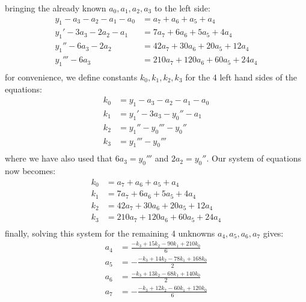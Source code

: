 bringing the already known $a_0, a_1, a_2, a_3$ to the left side:
\begin{equation}
\begin{aligned}
 y_1    -   a_3 -   a_2 - a_1 - a_0 &=     a_7 +     a_6 +    a_5 +    a_4  \\
 y_1'   - 3 a_3 - 2 a_2 - a_1       &=   7 a_7 +   6 a_6 +  5 a_5 +  4 a_4  \\
 y_1''  - 6 a_3 - 2 a_2             &=  42 a_7 +  30 a_6 + 20 a_5 + 12 a_4  \\ 
 y_1''' - 6 a_3                     &= 210 a_7 + 120 a_6 + 60 a_5 + 24 a_4  \\  
\end{aligned} 
\end{equation}
for convenience, we define constants $k_0, k_1, k_2, k_3$ for the 4 left hand sides of the equations:
\begin{equation}
\boxed
{
\begin{aligned}
 k_0 &= y_1    -   a_3  - a_2   - a_1 - a_0  \\
 k_1 &= y_1'   - 3 a_3  - y_0'' - a_1        \\
 k_2 &= y_1''  - y_0''' - y_0''              \\ 
 k_3 &= y_1''' - y_0'''                      \\  
\end{aligned} 
}
\end{equation}
where we have also used that $6 a_3 = y_0'''$ and $2 a_2 = y_0''$. Our system of equations now becomes:
\begin{equation}
\begin{aligned}
 k_0 &=     a_7 +     a_6 +    a_5 +    a_4  \\
 k_1 &=   7 a_7 +   6 a_6 +  5 a_5 +  4 a_4  \\
 k_2 &=  42 a_7 +  30 a_6 + 20 a_5 + 12 a_4  \\ 
 k_3 &= 210 a_7 + 120 a_6 + 60 a_5 + 24 a_4  \\  
\end{aligned} 
\end{equation}
finally, solving this system for the remaining 4 unknowns $a_4, a_5, a_6, a_7$ gives:
\begin{equation}
\boxed
{
\begin{aligned}
 a_4 &=   \frac{-k_3 + 15 k_2-90 k_1 +210 k_0}{6} \\
 a_5 &= - \frac{-k_3 + 14 k_2-78 k_1 +168 k_0}{2} \\
 a_6 &=   \frac{-k_3 + 13 k_2-68 k_1 +140 k_0}{2} \\ 
 a_7 &= - \frac{-k_3 + 12 k_2-60 k_1 +120 k_0}{6} \\  
\end{aligned} 
}
\end{equation}

